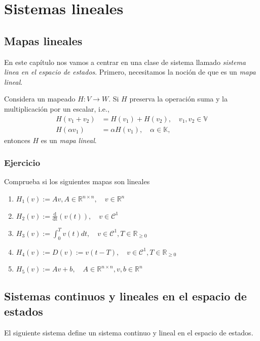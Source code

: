 \chapter{Sistemas lineales}\label{lineales}

\section{Mapas lineales}

En este capítulo nos vamos a centrar en una clase de sistema llamado \emph{sistema linea en el espacio de estados}. Primero, necesitamos la noción de que es un \emph{mapa lineal}.

\begin{definition} Considera un mapeado $H: V \to W$. Si $H$ preserva la operación suma y la multiplicación por un escalar, i.e.,
\begin{align}
	H(v_1+v_2) &= H(v_1) + H(v_2), \quad v_1, v_2\in\mathbb{V} \nonumber \\
	H(\alpha v_1) &= \alpha H(v_1), \quad \alpha\in\mathbb{K} \nonumber,
\end{align}
	entonces $H$ es un \emph{mapa lineal}.
\end{definition}

\subsection*{Ejercicio}
Comprueba si los siguientes mapas son lineales

\begin{enumerate}
	\item $H_1(v) := Av, A\in\mathbb{R}^{n\times n}, \quad v\in\mathbb{R}^n$
	\item $H_2(v) := \frac{\mathrm{d}}{\mathrm{dt}}(v(t)), \quad v\in\mathcal{C}^1$
	\item $H_3(v) := \int_0^T v(t) dt, \quad v\in\mathcal{C}^1, T\in\mathbb{R}_{\geq 0}$
	\item $H_4(v) := D(v) := v(t - T), \quad v\in\mathcal{C}^1, T\in\mathbb{R}_{\geq 0}$
	\item $H_5(v) := Av + b, \quad A\in\mathbb{R}^{n\times n}, v,b\in\mathbb{R}^n$
\end{enumerate}

\section{Sistemas continuos y lineales en el espacio de estados}

El siguiente sistema define un sistema continuo y lineal en el espacio de estados.

